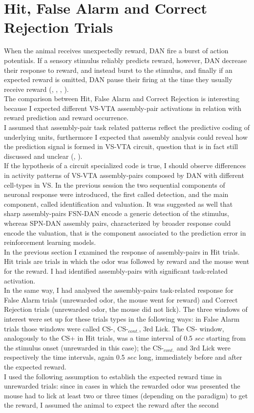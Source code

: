 \section{Hit, False Alarm and Correct Rejection Trials}
\label{sec:FalseAlCorrRej}
When the animal receives unexpectedly reward, DAN fire a burst of action potentials. If a sensory stimulus reliably predicts reward, however, DAN decrease their response to reward, and instead burst to the stimulus, and finally if an expected reward is omitted, DAN pause their firing at the time they usually receive reward (\cite{Schultz1997}, \cite{Wenzel}, \cite{Fiorillo2013b}, \cite{Schultz2015}).\\The comparison between Hit, False Alarm and Correct Rejection is interesting because I expected different VS-VTA assembly-pair activations in relation with reward prediction and reward occurrence.\\I assumed that assembly-pair task related patterns reflect the predictive coding of underlying units, furthermore I expected that assembly analysis could reveal how the prediction signal is formed in VS-VTA circuit, question that is in fact still discussed and unclear (\cite{Takahashi2016}, \cite{Saunders2018}).\\If the hypothesis of a circuit specialized code is true, I should observe differences in activity patterns of VS-VTA assembly-pairs composed by DAN with different cell-types in VS. In the previous session the two sequential components of neuronal response were introduced, the first called detection, and the main component, called identification and valuation. It was suggested as well that sharp assembly-pairs FSN-DAN encode a generic detection of the stimulus, whereas SPN-DAN assembly pairs, characterized by broader response could encode the valuation, that is the component associated to the prediction error in reinforcement learning models.\\In the previous section I examined the response of assembly-pairs in Hit trials. Hit trials are trials in which the odor was followed by reward and the mouse went for the reward. I had identified assembly-pairs with significant task-related activation.\\In the same way, I had analysed the assembly-pairs task-related response for False Alarm trials (unrewarded odor, the mouse went for reward) and Correct Rejection trials (unrewarded odor, the mouse did not lick). The three windows of interest were set up for these trials types in the following ways: in False Alarm trials those windows were called CS-, CS-$_{cont.}$, 3rd Lick. The CS- window, analogously to the CS+ in Hit trials, was a time interval of 0.5 $sec$ starting from the stimulus onset (unrewarded in this case); the CS-$_{cont.}$ and 3rd Lick were respectively the time intervals, again 0.5 $sec$ long, immediately before and after the expected reward.\\I used the following assumption to establish the expected reward time in unrewarded trials: since in cases in which the rewarded odor was presented the mouse had to lick at least two or three times (depending on the paradigm) to get the reward, I assumed the animal to expect the reward after the second 